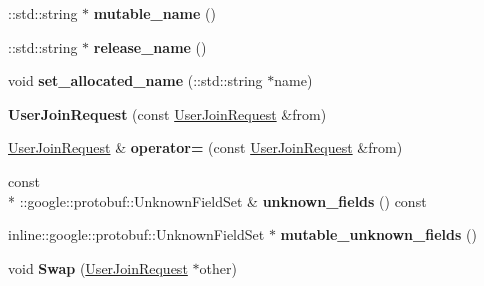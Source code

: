 \begin{DoxyCompactItemize}
\item 
\hypertarget{classSimpleChat_1_1UserJoinRequest_adc2f0a19ee7e0bfcbd0024c0217e2a34}{\-::std\-::string $\ast$ {\bfseries mutable\-\_\-name} ()}\label{classSimpleChat_1_1UserJoinRequest_adc2f0a19ee7e0bfcbd0024c0217e2a34}

\item 
\hypertarget{classSimpleChat_1_1UserJoinRequest_a42abc15d2a1e6a76b65d19d4d5cc8b29}{\-::std\-::string $\ast$ {\bfseries release\-\_\-name} ()}\label{classSimpleChat_1_1UserJoinRequest_a42abc15d2a1e6a76b65d19d4d5cc8b29}

\item 
\hypertarget{classSimpleChat_1_1UserJoinRequest_a6f0c2a29740247dd0b170ce1b91496e8}{void {\bfseries set\-\_\-allocated\-\_\-name} (\-::std\-::string $\ast$name)}\label{classSimpleChat_1_1UserJoinRequest_a6f0c2a29740247dd0b170ce1b91496e8}

\item 
\hypertarget{classSimpleChat_1_1UserJoinRequest_a5c314549198119d803ebcae6f918e0df}{{\bfseries User\-Join\-Request} (const \hyperlink{classSimpleChat_1_1UserJoinRequest}{User\-Join\-Request} \&from)}\label{classSimpleChat_1_1UserJoinRequest_a5c314549198119d803ebcae6f918e0df}

\item 
\hypertarget{classSimpleChat_1_1UserJoinRequest_a94e16681aba97f45338f5273ef4844e1}{\hyperlink{classSimpleChat_1_1UserJoinRequest}{User\-Join\-Request} \& {\bfseries operator=} (const \hyperlink{classSimpleChat_1_1UserJoinRequest}{User\-Join\-Request} \&from)}\label{classSimpleChat_1_1UserJoinRequest_a94e16681aba97f45338f5273ef4844e1}

\item 
\hypertarget{classSimpleChat_1_1UserJoinRequest_a90b9270f5623668f8d121a5614f771d6}{const \\*
\-::google\-::protobuf\-::\-Unknown\-Field\-Set \& {\bfseries unknown\-\_\-fields} () const }\label{classSimpleChat_1_1UserJoinRequest_a90b9270f5623668f8d121a5614f771d6}

\item 
\hypertarget{classSimpleChat_1_1UserJoinRequest_a57ca214eb06071e26fef7d1bbb4b883d}{inline\-::google\-::protobuf\-::\-Unknown\-Field\-Set $\ast$ {\bfseries mutable\-\_\-unknown\-\_\-fields} ()}\label{classSimpleChat_1_1UserJoinRequest_a57ca214eb06071e26fef7d1bbb4b883d}

\item 
\hypertarget{classSimpleChat_1_1UserJoinRequest_a427d21d6091c09e761ebbba4a0d80393}{void {\bfseries Swap} (\hyperlink{classSimpleChat_1_1UserJoinRequest}{User\-Join\-Request} $\ast$other)}\label{classSimpleChat_1_1UserJoinRequest_a427d21d6091c09e761ebbba4a0d80393}


\end{DoxyCompactItemize}
